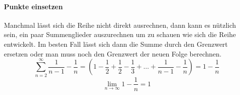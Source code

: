 \paragraph{Punkte einsetzen}
Manchmal lässt sich die Reihe nicht direkt ausrechnen, dann kann es nützlich sein, ein paar Summenglieder auszurechnen um zu schauen wie sich die Reihe entwickelt. Im besten Fall lässt sich dann die Summe durch den Grenzwert ersetzen oder man muss noch den Grenzwert der neuen Folge berechnen. 
\[
	\sum_{n=2}^\infty \frac{1}{n-1} - \frac{1}{n} = \left( 1 - \frac{1}{2} + \frac{1}{2} - \frac{1}{3} + \ldots + \frac{1}{n-1} - \frac{1}{n} \right) = 1 - \frac{1}{n}
\]
\[
	\lim_{n \to \infty} 1 - \frac{1}{n} = 1
\]

